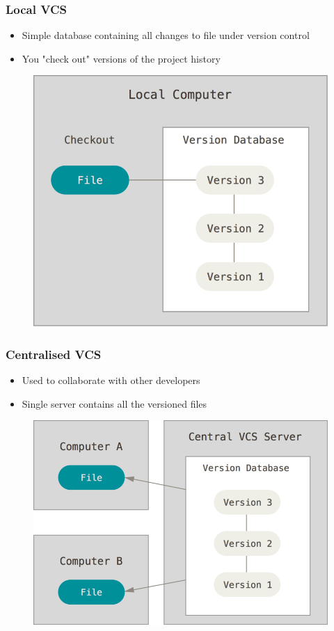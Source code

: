 \documentclass{beamer}
\begin{document}
\begin{frame}
	\frametitle{Local VCS}
	\begin{itemize}
		\item{Simple database containing all changes to file under version control}
		\item{You "check out" versions of the project history}
	\end{itemize}
	\begin{figure}
		\includegraphics[scale=0.25]{Local_VCS-0.png}
	\end{figure}
\end{frame}

\begin{frame}
	\frametitle{Centralised VCS}
	\begin{itemize}
		\item{Used to collaborate with other developers}
		\item{Single server contains all the versioned files}
	\end{itemize}
	\begin{figure}
		\includegraphics[scale=0.25]{Centralised_VCS-0.png}
	\end{figure}

\end{frame}
\end{document}
